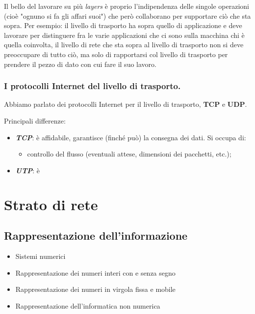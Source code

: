 \documentclass[10pt, a4paper, openany]{book}
\begin{document}
\noindent Il bello del lavorare su più \textit{layers} è proprio l'indipendenza delle singole operazioni (cioè "ognuno si fa gli affari suoi") che però collaborano per supportare ciò che sta sopra. Per esempio: il livello di trasporto ha sopra quello di applicazione e deve lavorare per distinguere fra le varie applicazioni che ci sono sulla macchina chi è quella coinvolta, il livello di rete che sta sopra al livello di trasporto non si deve preoccupare di tutto ciò, ma solo di rapportarsi col livello di trasporto per prendere il pezzo di dato con cui fare il suo lavoro.

\subsection{I protocolli Internet del livello di trasporto.}
\noindent Abbiamo parlato dei protocolli Internet per il livello di trasporto, \textbf{TCP} e \textbf{UDP}.

\noindent Principali differenze:
\begin{itemize}
    \item \textbf{\textit{TCP}}: è affidabile, garantisce (finché può) la consegna dei dati. Si occupa di:
    \begin{itemize}
        \item controllo del flusso (eventuali attese, dimensioni dei pacchetti, etc.);
    \end{itemize}
    \item \textbf{\textit{UTP}}: è
\end{itemize}


























\chapter{Strato di rete}
\section{Rappresentazione dell'informazione}
\begin{itemize}
    \item Sistemi numerici
    \item Rappresentazione dei numeri interi con e senza segno
    \item Rappresentazione dei numeri in virgola fissa e mobile
    \item Rappresentazione dell'informatica non numerica
\end{itemize}
\end{document}
